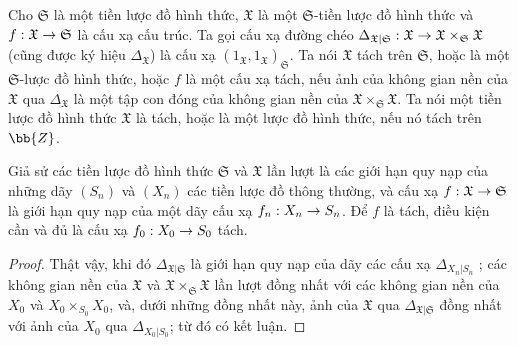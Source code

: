 \documentclass[oneside]{amsart}
\makeatletter
\newcommand{\ega@arrow}[2]{\mathchoice{#1}{#2}{#2}{#2}}
\renewcommand{\to}{\ega@arrow{\longrightarrow}{\rightarrow}}
\let\EGAOriginalLabel\label
\renewcommand{\label}[1]{\phantomsection\EGAOriginalLabel{#1}}
\makeatother
\begin{document}
\begin{definition}[10.15.1]
\label{I.10.15.1}
Cho $\mathfrak{S}$ là một tiền lược đồ hình thức, $\mathfrak{X}$ là một $\mathfrak{S}$-tiền lược đồ hình thức và $f:\mathfrak{X}\to\mathfrak{S}$ là cấu xạ cấu trúc.
Ta gọi cấu xạ đường chéo $\Delta_{\mathfrak{X}|\mathfrak{S}}:\mathfrak{X}\to\mathfrak{X}\times_\mathfrak{S}\mathfrak{X}$ (cũng được ký hiệu $\Delta_\mathfrak{X}$) là cấu xạ $(1_\mathfrak{X},1_\mathfrak{X})_\mathfrak{S}$.
Ta nói $\mathfrak{X}$ tách trên $\mathfrak{S}$, hoặc là một $\mathfrak{S}$-lược đồ hình thức, hoặc $f$ là một cấu xạ tách, nếu ảnh của không gian nền của $\mathfrak{X}$ qua $\Delta_\mathfrak{X}$ là một tập con đóng của không gian nền của $\mathfrak{X}\times_\mathfrak{S}\mathfrak{X}$.
Ta nói một tiền lược đồ hình thức $\mathfrak{X}$ là tách, hoặc là một lược đồ hình thức, nếu nó tách trên $\bb{Z}$.
\end{definition}

\begin{proposition}[10.15.2]
\label{I.10.15.2}
Giả sử các tiền lược đồ hình thức $\mathfrak{S}$ và $\mathfrak{X}$ lần lượt là các giới hạn quy nạp của những dãy $(S_n)$ và $(X_n)$ các tiền lược đồ thông thường, và cấu xạ $f:\mathfrak{X}\to\mathfrak{S}$ là giới hạn quy nạp của một dãy cấu xạ $f_n:X_n\to S_n$.
Để $f$ là tách, điều kiện cần và đủ là cấu xạ $f_0:X_0\to S_0$ tách.
\end{proposition}

\begin{proof}
Thật vậy, khi đó $\Delta_{\mathfrak{X}|\mathfrak{S}}$ là giới hạn quy nạp của dãy các cấu xạ $\Delta_{X_n|S_n}$ ; các không gian nền của $\mathfrak{X}$ và $\mathfrak{X}\times_\mathfrak{S}\mathfrak{X}$ lần lượt đồng nhất với các không gian nền của $X_0$ và $X_0\times_{S_0}X_0$, và, dưới những đồng nhất này, ảnh của $\mathfrak{X}$ qua $\Delta_{\mathfrak{X}|\mathfrak{S}}$ đồng nhất với ảnh của $X_0$ qua $\Delta_{X_0|S_0}$;
từ đó có kết luận.
\end{proof}
\end{document}
